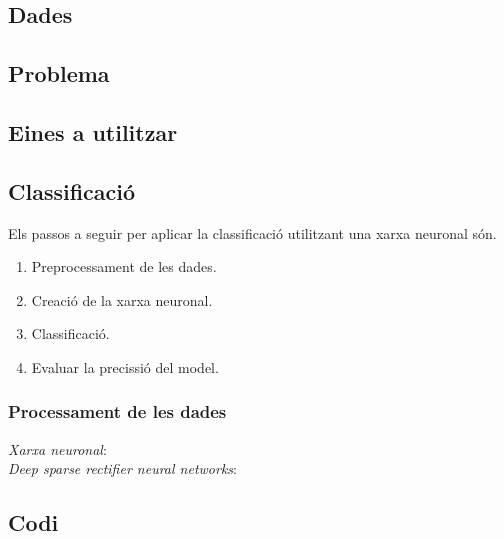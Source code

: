 \documentclass[12pt]{article}
\begin{document}
\subsection{Dades}
\subsection{Problema}
\subsection{Eines a utilitzar}
\subsection{Classificació}
Els passos a seguir per aplicar la classificació utilitzant una xarxa neuronal són.
\begin{enumerate}
	\item Preprocessament de les dades.
	\item Creació de la xarxa neuronal.
	\item Classificació.
	\item Evaluar la precissió del model.
\end{enumerate}
\subsubsection{Processament de les dades}

\clearpage
\begin{thebibliography}{9}
	\textit{Xarxa neuronal}:
  	\\
	\textit{Deep sparse rectifier neural networks}:
  	\\
\end{thebibliography}

\clearpage
\begin{appendices}
\section{Codi}
\end{appendices}
\end{document}
